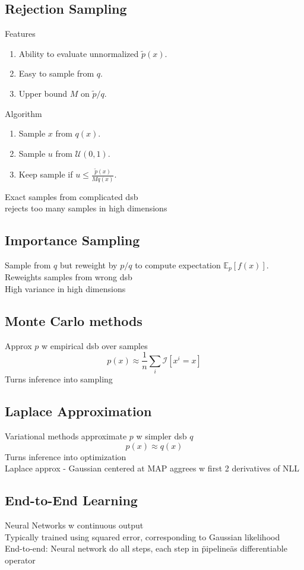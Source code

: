 \subsection*{Rejection Sampling}
Features
\begin{enumerate}
    \item Ability to evaluate unnormalized $\tilde{p}(x)$.
    \item Easy to sample from $q$.
    \item Upper bound $M$ on $\tilde{p}/q$.
\end{enumerate}
Algorithm
\begin{enumerate}
    \item Sample $x$ from $q(x)$.
    \item Sample $u$ from $\mathcal{U}(0,1)$.
    \item Keep sample if $u\leq\frac{\tilde{p}(x)}{Mq(x)}$.
\end{enumerate}
Exact samples from complicated dsb\\
rejects too many samples in high dimensions
\subsection*{Importance Sampling}
Sample from $q$ but reweight by $p/q$ to compute expectation $\mathbb{E}_p[f(x)]$.\\
Reweights samples from wrong dsb\\
High variance in high dimensions
\subsection*{Monte Carlo methods}
Approx $p$ w empirical dsb over samples
\[p(x)\approx\frac{1}{n}\sum_i\mathcal{I}[x^i=x]\]
Turns inference into sampling
\subsection*{Laplace Approximation}
Variational methods approximate $p$ w simpler dsb $q$\\
\[p(x)\approx q(x)\]
Turns inference into optimization\\
Laplace approx - Gaussian centered at MAP aggrees w first 2 derivatives of NLL
\subsection*{End-to-End Learning}
Neural Networks w continuous output\\
Typically trained using squared error, corresponding to Gaussian likelihood\\
End-to-end: Neural network do all steps, each step in \"pipeline\" as differentiable operator
